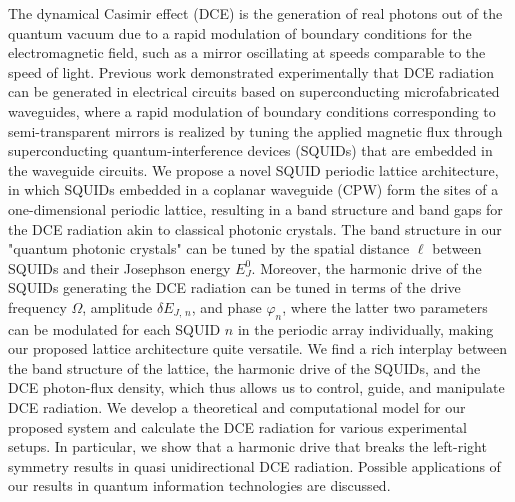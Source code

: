 

The dynamical Casimir effect (DCE) is the generation of real photons out of the quantum vacuum due to a rapid modulation of boundary conditions for the electromagnetic field, such as a mirror oscillating at speeds comparable to the speed of light. 
Previous work demonstrated experimentally that
DCE radiation can be generated 
in electrical circuits based on superconducting microfabricated waveguides, where a rapid modulation of boundary conditions corresponding to semi-transparent mirrors is realized by tuning the applied magnetic flux through superconducting quantum-interference devices (SQUIDs) that are embedded in the waveguide circuits. We propose a novel SQUID periodic lattice architecture, in which SQUIDs embedded in a coplanar waveguide (CPW) form the sites of a one-dimensional periodic lattice, resulting in a band structure and band gaps for the DCE radiation akin to classical photonic crystals. The band structure in our "quantum photonic crystals"
can be tuned by the spatial distance $\ell$ between SQUIDs and their Josephson energy $E_J^0$. Moreover, the harmonic drive of the SQUIDs generating the DCE radiation can be tuned in terms of the drive frequency $\Omega$, amplitude $\delta E_{J,\,n}$, and phase $\varphi_n$, where the latter two parameters can be modulated for each SQUID $n$ in the periodic array individually, making our proposed lattice architecture quite versatile. We find a rich interplay between the band structure of the lattice, 
the harmonic drive of the SQUIDs, and the DCE photon-flux density, which thus allows us to control, guide, and manipulate DCE radiation. 
We develop a theoretical and computational model for our proposed system and calculate the DCE radiation 
for various experimental setups. In particular, we show that a harmonic drive that breaks the left-right symmetry
results in quasi unidirectional DCE radiation. Possible applications of our results in quantum information technologies
are discussed.








